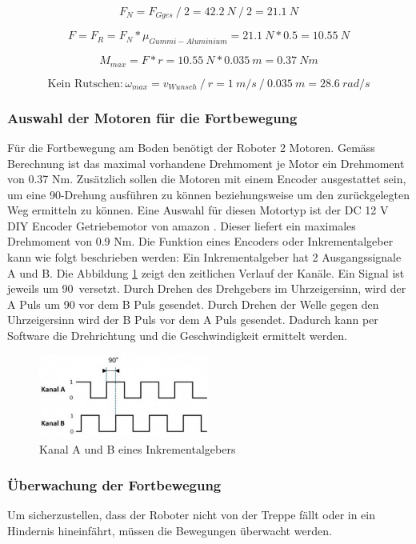 \[F_N = F_{Gges}\ /\ 2 = 42.2\ N\ /\ 2 = 21.1\ N \]

\[F = F_R = F_N * {\mu_{Gummi-Aluminium}} = 21.1\ N * 0.5 = 10.55\ N\]

\[M_{max} = F * r = 10.55\ N * 0.035\ m = 0.37\ Nm\]

\[\text{Kein Rutschen}: \omega_{max} = v_{Wunsch}\ /\ r = 1\ m/s\ /\ 0.035\ m = 28.6\ rad/s\]


\subsubsection{Auswahl der Motoren für die Fortbewegung}
Für die Fortbewegung am Boden benötigt der Roboter 2 Motoren. Gemäss Berechnung ist das maximal vorhandene Drehmoment je Motor ein Drehmoment von 0.37 Nm. Zusätzlich sollen die Motoren mit einem Encoder ausgestattet sein, um eine 90\textdegree-Drehung ausführen zu können beziehungsweise um den zurückgelegten Weg ermitteln zu können. Eine Auswahl für diesen Motortyp ist der DC 12 V DIY Encoder Getriebemotor von amazon \cite{MotorEncoder}. Dieser liefert ein maximales Drehmoment von 0.9 Nm. 
Die Funktion eines Encoders oder Inkrementalgeber kann wie folgt beschrieben werden: Ein Inkrementalgeber hat 2 Ausgangssignale \glqq A\grqq{} und \glqq B\grqq{}. Die Abbildung \ref{fig:encoder-signal} zeigt den zeitlichen Verlauf der Kanäle. Ein Signal ist jeweils um 90\textdegree\ versetzt. Durch Drehen des Drehgebers im Uhrzeigersinn, wird der \glqq A\grqq{} Puls um 90\textdegree{} vor dem \glqq B\grqq{} Puls gesendet. Durch Drehen der Welle gegen den Uhrzeigersinn wird der \glqq B\grqq{} Puls vor dem \glqq A\grqq{} Puls gesendet. Dadurch kann per Software die Drehrichtung und die Geschwindigkeit ermittelt werden.

\begin{figure}[H]
  \includegraphics[width=0.5\textwidth]{img/Fortbewegung/Increment Encoder Signal.png}
  \centering
  \caption{Kanal A und B eines Inkrementalgebers}
  \label{fig:encoder-signal}
\end{figure}


\subsubsection{Überwachung der Fortbewegung}
Um sicherzustellen, dass der Roboter nicht von der Treppe fällt oder in ein Hindernis hineinfährt, müssen die Bewegungen überwacht werden.

